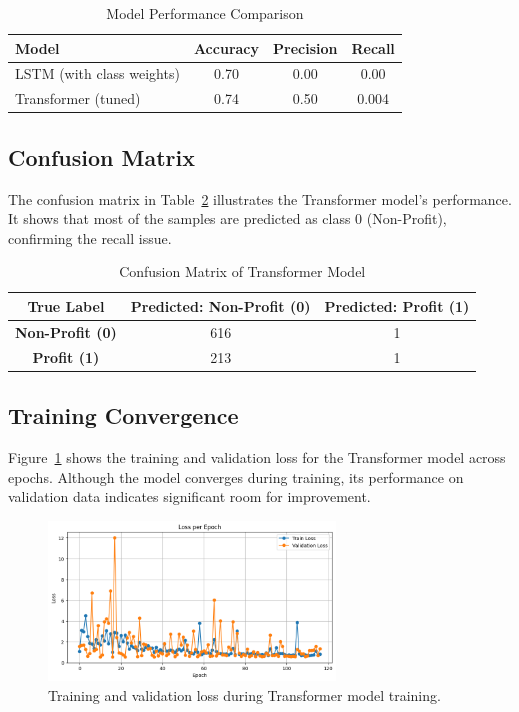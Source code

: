 \documentclass[letterpaper, 10 pt, conference]{ieeeconf}  %
\begin{document}
\begin{table}[h]
\caption{Model Performance Comparison}
\label{table:model_performance}
\centering
\begin{tabular}{lccc}
\toprule
\textbf{Model} & \textbf{Accuracy} & \textbf{Precision} & \textbf{Recall} \\
\midrule
LSTM (with class weights) & 0.70 & 0.00 & 0.00 \\
Transformer (tuned) & 0.74 & 0.50 & 0.004 \\
\bottomrule
\end{tabular}
\end{table}

\subsection{Confusion Matrix}
The confusion matrix in Table~\ref{table:confusion_matrix} illustrates the Transformer model's performance. It shows that most of the samples are predicted as class 0 (Non-Profit), confirming the recall issue.

\begin{table}[h!]
\caption{Confusion Matrix of Transformer Model}
\label{table:confusion_matrix}
\centering
\begin{tabular}{|c|c|c|}
\hline
\textbf{True Label} & \textbf{Predicted: Non-Profit (0)} & \textbf{Predicted: Profit (1)} \\ \hline
\textbf{Non-Profit (0)} & 616 & 1 \\ \hline
\textbf{Profit (1)} & 213 & 1 \\ \hline
\end{tabular}
\end{table}

\subsection{Training Convergence}
Figure~\ref{fig:training_loss_transformer} shows the training and validation loss for the Transformer model across epochs. Although the model converges during training, its performance on validation data indicates significant room for improvement.

\begin{figure}[h]
    \centering
    \includegraphics[width=3.0in]{fig2-trasnformer_epoch.png}
    \caption{Training and validation loss during Transformer model training.}
    \label{fig:training_loss_transformer}
\end{figure}
\end{document}
